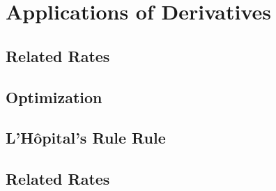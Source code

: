 \chapter{Applications of Derivatives}

\section{Related Rates}

\section{Optimization}

\section{L'H\^{o}pital's Rule Rule}

\section{Related Rates}